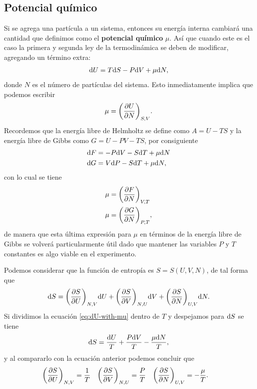 \subsection{Potencial químico}
Si se agrega una partícula a un sistema, entonces su energía interna
cambiará una cantidad que definimos como el \textbf{potencial químico}
$\mu$. Así que cuando este es el caso la primera y segunda ley de la
termodinámica se deben de modificar, agregando un término extra:
\begin{align}
\mathrm{d} U=T\mathrm{d} S-P\mathrm{d} V+\mu \mathrm{d} N,
\label{eq:dU-with-mu}
\end{align}
donde $N$ es el número de partículas del sistema. Esto inmediatamente 
implica que podemos escribir 
\begin{align}
\mu=\qty(\pdv{U}{N})_{S,V}.
\end{align}
Recordemos que la energía libre de Helmholtz se define como 
$A=U-TS$ y la energía libre de Gibbs como $G=U-PV-TS$, por consiguiente
\begin{align}
\mathrm{d} F&=-P\mathrm{d} V -S\mathrm{d} T+\mu \mathrm{d} N\\
\mathrm{d} G&=V\mathrm{d} P-S\mathrm{d} T+\mu\mathrm{d} N,
\end{align}
con lo cual se tiene 
\begin{align}
\mu &=\qty(\pdv{F}{N})_{V,T}\\
\mu &=\qty(\pdv{G}{N})_{P,T},
\end{align}
de manera que esta última expresión para $\mu$ en términos de la energía
libre de Gibbs se volverá particularmente útil dado que mantener las variables 
$P$ y $T$ constantes es algo viable en el experimento.

Podemos considerar que la función de entropía es $S=S(U,V,N)$,
de tal forma que 
\begin{align}
\mathrm{d} S=\qty(\pdv{S}{U})_{N,V}\mathrm{d} U+
\qty(\pdv{S}{V})_{N,U}\mathrm{d} V+
\qty(\pdv{S}{N})_{U,V}\mathrm{d} N.
\end{align}
Si dividimos la ecuación \eqref{eq:dU-with-mu} dentro de $T$ y 
despejamos para $\mathrm{d} S$ se tiene
\begin{align}
\mathrm{d} S=\frac{\mathrm{d} U}{T}+\frac{P\mathrm{d} V}{T}-\frac{\mu\mathrm{d} N}{T},
\end{align}
y al compararlo con la ecuación anterior podemos concluir que 
\begin{align}
\qty(\pdv{S}{U})_{N,V}&=\frac{1}{T} &
\qty(\pdv{S}{V})_{N,U} &=\frac{P}{T} &
\qty(\pdv{S}{N})_{U,V} &=-\frac{\mu}{T}.	
\end{align}